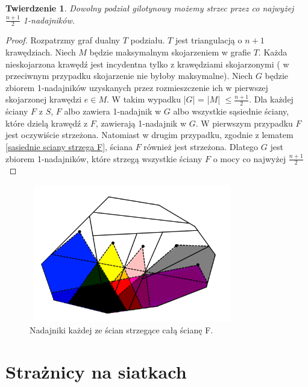 \documentclass[brudnopis]{xmgr}
\newtheorem{Twierdzenie}{Twierdzenie} \theoremstyle{definition}
\begin{document}
\begin{Twierdzenie}
  Dowolny podział gilotynowy możemy strzec przez co najwyżej $\frac{n+1}{2}$ 1-nadajników.
\end{Twierdzenie}
\begin{proof}
	Rozpatrzmy graf dualny $T$ podziału. $T$ jest triangulacją o $n + 1$ krawędziach. Niech $M$ będzie maksymalnym skojarzeniem w grafie $T$. Każda nieskojarzona krawędź jest incydentna tylko z krawędziami skojarzonymi ( w przeciwnym przypadku skojarzenie nie byłoby maksymalne). Niech $G$ będzie zbiorem 1-nadajników uzyskanych przez rozmieszczenie ich w pierwszej skojarzonej krawędzi $e \in M$. W takim wypadku |$G$| = |$M$| $\le \frac{n+1}{2}$. Dla każdej ściany $F$ z $S$, $F$ albo zawiera 1-nadajnik w $G$ albo wszystkie sąsiednie ściany, które dzielą krawędź z $F$, zawierają 1-nadajnik w $G$. W pierwszym przypadku $F$ jest oczywiście strzeżona. Natomiast w drugim przypadku, zgodnie z lematem \ref{sasiednie sciany strzega F}, ściana $F$ również jest strzeżona. Dlatego $G$ jest zbiorem 1-nadajników, które strzegą wszystkie ściany $F$ o mocy co najwyżej $\frac{n+1}{2}$
\end{proof}

\begin{figure}[ht!]
  \centering
  \label{pokrycie f}
  \includegraphics[width=9cm,height=6cm]{rysunki/pokrycie_f.png}
  \caption{Nadajniki każdej ze ścian strzegące całą ścianę F.}
\end{figure} 

\chapter{Strażnicy na siatkach}
\end{document}

